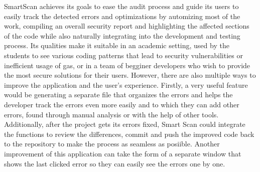 SmartScan achieves its goals to ease the audit process and guide its users to easily track the detected errors and optimizations by automizing most of the work, compiling an overall security report and highlighting the affected sections of the code while also naturally integrating into the development and testing process. Its qualities make it suitable in an academic setting, used by the students to see various coding patterns that lead to security vulnerabilities or inefficient usage of gas, or in a team of begginer developers who wish to provide the most secure solutions for their users. However, there are also multiple ways to improve the application and the user's experience. Firstly, a very useful feature would be generating a separate file that organizes the errors and helps the developer track the errors even more easily and to which they can add other errors, found through manual analysis or with the help of other tools. Additionally, after the project gets its errors fixed, Smart Scan could integrate the functions to review the differences, commit and push the improved code back to the repository to make the process as seamless as posiible. Another improvement of this application can take the form of a separate window that shows the last clicked error so they can easily see the errors one by one.


